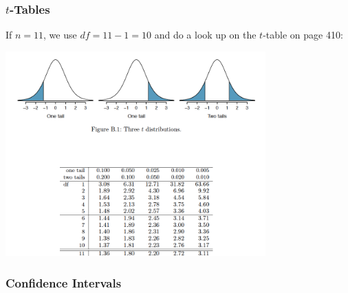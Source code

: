 \documentclass[handout]{beamer}
\newcommand{\xbar}{\overline{x}}
\begin{document}
\begin{frame}
\frametitle{$t$-Tables}
If $n=11$, we use $df=11-1=10$ and do a look up on the $t$-table on page 410:

\begin{center}
\includegraphics[width=0.75\textwidth]{figure/t.png}
\end{center}

\end{frame}


\begin{frame}
\frametitle{Confidence Intervals}

%
%
%

\end{frame}
\end{document}
